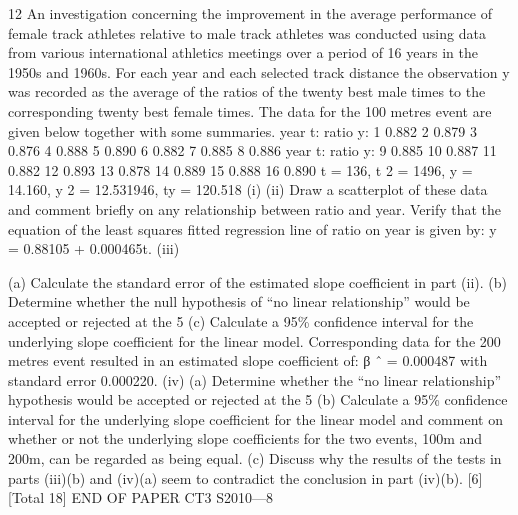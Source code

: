 \documentclass[a4paper,12pt]{article}
\begin{document}
\begin{enumerate}

12
An investigation concerning the improvement in the average performance of female
track athletes relative to male track athletes was conducted using data from various
international athletics meetings over a period of 16 years in the 1950s and 1960s. For
each year and each selected track distance the observation y was recorded as the
average of the ratios of the twenty best male times to the corresponding twenty best
female times.
The data for the 100 metres event are given below together with some summaries.
year t:
ratio y: 1
0.882 2
0.879 3
0.876 4
0.888 5
0.890 6
0.882 7
0.885 8
0.886
year t:
ratio y: 9
0.885 10
0.887 11
0.882 12
0.893 13
0.878 14
0.889 15
0.888 16
0.890
\sigma t = 136, \sigma t 2 = 1496, \sigma y = 14.160, \sigma y 2 = 12.531946, \sigma ty = 120.518
(i)
(ii)
Draw a scatterplot of these data and comment briefly on any relationship
between ratio and year.
Verify that the equation of the least squares fitted regression line of ratio on
year is given by:
y = 0.88105 + 0.000465t.
(iii)


(a) Calculate the standard error of the estimated slope coefficient in part
(ii).
(b) Determine whether the null hypothesis of “no linear relationship”
would be accepted or rejected at the 5%
(c) Calculate a 95\% confidence interval for the underlying slope
coefficient for the linear model.
Corresponding data for the 200 metres event resulted in an estimated slope coefficient
of:
β ˆ = 0.000487 with standard error 0.000220.
(iv)
(a) Determine whether the “no linear relationship” hypothesis would be
accepted or rejected at the 5%
(b) Calculate a 95\% confidence interval for the underlying slope
coefficient for the linear model and comment on whether or not the
underlying slope coefficients for the two events, 100m and 200m, can
be regarded as being equal.
(c) Discuss why the results of the tests in parts (iii)(b) and (iv)(a) seem to
contradict the conclusion in part (iv)(b).
[6]
[Total 18]
END OF PAPER
CT3 S2010—8








\end{enumerate}
\end{document}
